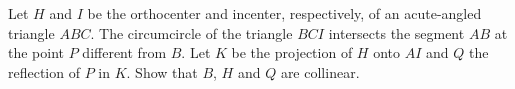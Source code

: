 Let $H$ and $I$ be the orthocenter and incenter, respectively, of an acute-angled triangle $ABC$. The circumcircle of the triangle $BCI$ intersects the segment $AB$ at the point $P$ different from $B$. Let $K$ be the projection of $H$ onto $AI$ and $Q$ the reflection of $P$ in $K$. Show that $B$,  $H$ and $Q$ are collinear.